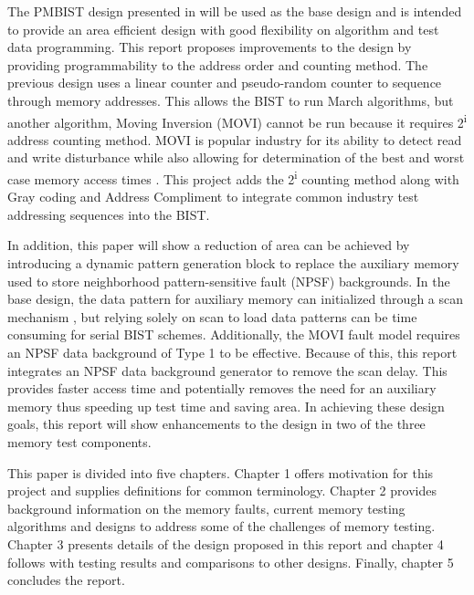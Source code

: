 The PMBIST design presented in \cite{1584083} will be used as the base design and is intended to provide an area efficient design with good flexibility on algorithm and test data programming.  This report proposes improvements to the design by providing programmability to the address order and counting method. The previous design uses a linear counter and pseudo-random counter to sequence through memory addresses.  This allows the BIST to run March algorithms, but another algorithm, Moving Inversion (MOVI) cannot be run because it requires 2\textsuperscript{i} address counting method.   MOVI is popular industry for its ability to detect read and write disturbance while also allowing for determination of the best and worst case memory access times \cite{VanDeGoor1991}.  This project adds the 2\textsuperscript{i} counting method along with Gray coding and Address Compliment to integrate common industry test addressing sequences into the BIST. 

In addition, this paper will show a reduction of area can be achieved by introducing a dynamic pattern generation block to replace the auxiliary memory used to store neighborhood pattern-sensitive fault (NPSF) backgrounds.  In the base design, the data pattern for auxiliary memory can initialized through a scan mechanism \cite{748806}, but relying solely on scan to load data patterns can be time consuming for serial BIST schemes.  Additionally, the MOVI fault model requires an NPSF data background of Type 1 to be effective.  Because of this, this report integrates an NPSF data background generator to remove the scan delay.  This provides faster access time and potentially removes the need for an auxiliary memory thus speeding up test time and saving area.  In achieving these design goals, this report will show enhancements to the \cite{1584083} design in two of the three memory test components.

This paper is divided into five chapters.
Chapter 1 offers motivation for this project and supplies definitions for common terminology.  Chapter 2 provides background information on the memory faults, current memory testing algorithms and designs to address some of the challenges of memory testing.  Chapter 3 presents details of the design proposed in this report and chapter 4 follows with testing results and comparisons to other designs.
Finally, chapter 5 concludes the report.  




